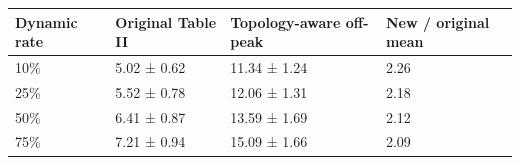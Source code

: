 \begin{tabular}{llll}
\hline
Dynamic rate & Original Table II & Topology-aware off-peak & New / original mean \\
\hline
10\% & 5.02 ± 0.62 & 11.34 ± 1.24 & 2.26 \\
25\% & 5.52 ± 0.78 & 12.06 ± 1.31 & 2.18 \\
50\% & 6.41 ± 0.87 & 13.59 ± 1.69 & 2.12 \\
75\% & 7.21 ± 0.94 & 15.09 ± 1.66 & 2.09 \\
\hline
\end{tabular}

